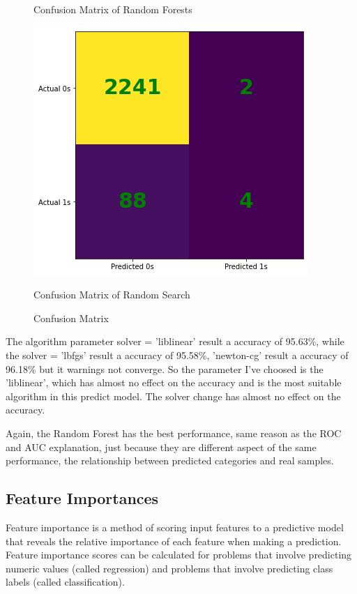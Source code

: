 \documentclass[11pt]{report}
\begin{document}
\begin{figure}[h]
\begin{minipage}{0.32\textwidth}
     \caption{Confusion Matrix of Random Forests}\label{fig:rf_cm}
     \end{minipage}
     \centering
     \begin{minipage}{0.32\textwidth}
     \centering
     \includegraphics[width = \linewidth]{rs_cm.png}
     \caption{Confusion Matrix of Random Search}\label{fig:rs_cm}
     \end{minipage}
     \caption{Confusion Matrix}\label{fig:cm}
\end{figure}

The algorithm parameter solver = 'liblinear' result a accuracy of 95.63\%, while the solver = 'lbfgs' result a accuracy of 95.58\%, 'newton-cg' result a accuracy of 96.18\% but it warnings not converge. So the parameter I've choosed is the 'liblinear', which has almost no effect on the accuracy and is the most suitable algorithm in this predict model. The solver change has almost no effect on the accuracy.

Again, the Random Forest has the best performance, same reason as the ROC and AUC explanation, just because they are different aspect of the same performance, the relationship between predicted categories and real samples.

\subsection{Feature Importances}
Feature importance is a method of scoring input features to a predictive model that reveals the relative importance of each feature when making a prediction. Feature importance scores can be calculated for problems that involve predicting numeric values (called regression) and problems that involve predicting class labels (called classification).
\end{document}
